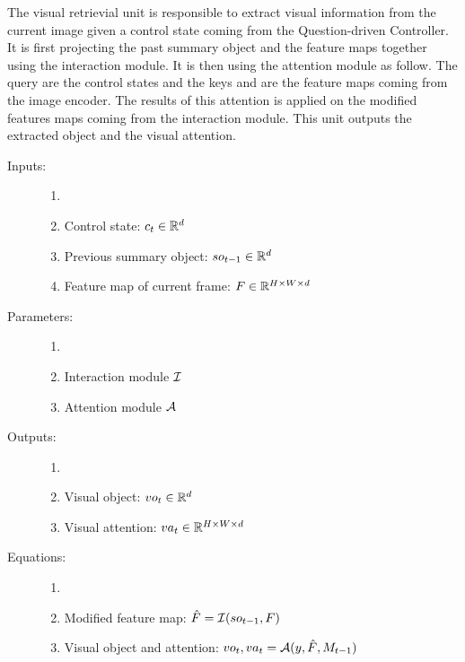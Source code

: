 
The visual retrievial unit is responsible to extract visual information from the current image given a control state coming from the Question-driven Controller. It is first projecting the past summary object and the feature maps together using the interaction module.
It is then using the attention module as follow. The query are the control states and the keys and are the feature maps coming from the image encoder. The results of this attention is applied on the modified features maps coming from the interaction module.  
This unit outputs the extracted object and the visual attention.

\begin{description}
	\item[Inputs:] 
	\begin{enumerate}
		\item[]
		\item Control state: $c_t \in \mathbb{R}^d$	
		\item Previous summary object: $so_{t-1} \in \mathbb{R}^d$
		\item Feature map of current frame: $F \in \mathbb{R}^{H \times W \times d}$
	\end{enumerate}
	
	\item[Parameters:] 
	\begin{enumerate}
		\item[]
		\item Interaction module $\mathcal{I}$
		\item Attention module $\mathcal{A}$
	\end{enumerate}
	
	\item[Outputs:] 
	\begin{enumerate}
		\item[]
		\item Visual object: $vo_t \in  \mathbb{R}^d$
		\item Visual attention: $va_t  \in \mathbb{R}^{H \times W \times d}$
	\end{enumerate}
	
	\item[Equations:]
	\begin{enumerate}
		\item[]
		\item Modified feature map: $\hat{F} = \mathcal{I}(so_{t-1}, F)$
		\item Visual object and attention: $vo_t, va_t = \mathcal{A}(y, \hat{F}, M_{t-1})$
	\end{enumerate}
\end{description}

